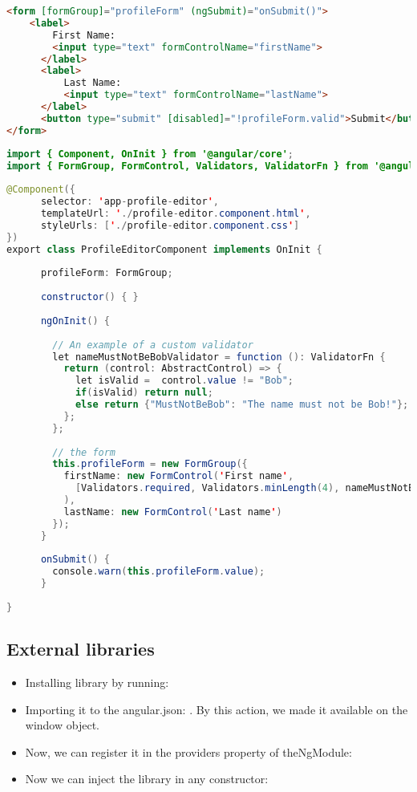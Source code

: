 \begin{lstlisting}[language=html]
<form [formGroup]="profileForm" (ngSubmit)="onSubmit()">
    <label>
        First Name:
        <input type="text" formControlName="firstName">
      </label>
      <label>
          Last Name:
          <input type="text" formControlName="lastName">
      </label>
      <button type="submit" [disabled]="!profileForm.valid">Submit</button>
</form>
\end{lstlisting}
\begin{lstlisting}[language=java]
import { Component, OnInit } from '@angular/core';
import { FormGroup, FormControl, Validators, ValidatorFn } from '@angular/forms';
    
@Component({
      selector: 'app-profile-editor',
      templateUrl: './profile-editor.component.html',
      styleUrls: ['./profile-editor.component.css']
})
export class ProfileEditorComponent implements OnInit {
    
      profileForm: FormGroup;
    
      constructor() { }
    
      ngOnInit() {
    
        // An example of a custom validator
        let nameMustNotBeBobValidator = function (): ValidatorFn {
          return (control: AbstractControl) => {
            let isValid =  control.value != "Bob";
            if(isValid) return null;
            else return {"MustNotBeBob": "The name must not be Bob!"};
          };
        };
    
        // the form
        this.profileForm = new FormGroup({
          firstName: new FormControl('First name', 
            [Validators.required, Validators.minLength(4), nameMustNotBeBobValidator ]
          ),
          lastName: new FormControl('Last name')
        });
      }
    
      onSubmit() {
        console.warn(this.profileForm.value);
      }
    
}
\end{lstlisting}    


\subsection{External libraries}
\begin{itemize}
  \item Installing library by running: 
  \item Importing it to the angular.json: . By this action, we made it available on the window object.
  \item Now, we can register it in the providers property of theNgModule: 
  \item Now we can inject the library in any constructor: 
\end{itemize}

